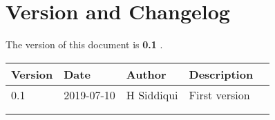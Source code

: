 \section{Version and Changelog}

The version of this document is {\bf 0.1} .

\begin{table}[H]
    \begin{tabular}{|l|l|l|l| p{5cm} }
    \hline
    \rowcolor[HTML]{000000} 
    {\color[HTML]{FFFFFF} Version} & {\color[HTML]{FFFFFF} Date} & {\color[HTML]{FFFFFF} Author} & {\color[HTML]{FFFFFF} Description} \\ \hline
    0.1 & 2019-07-10 & \multicolumn{1}{r|}{H Siddiqui} & First version \\ \hline
    \rowcolor[HTML]{EFEFEF} 
     &  & \multicolumn{1}{r|}{\cellcolor[HTML]{EFEFEF}} &  \\ \hline
     &  &  &  \\ \hline
    \end{tabular}
\end{table}

